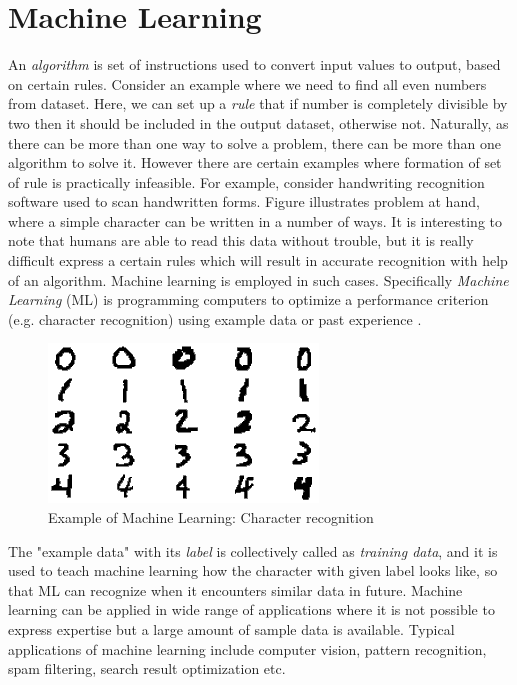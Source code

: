 \chapter{Machine Learning}
\label{chap:chapter3}
An \emph{algorithm} is set of instructions used to convert input values to output, based on certain rules. Consider an example where we need to find all even numbers from dataset. Here, we can set up a \emph{rule} that if number is completely divisible by two then it should be included in the output dataset, otherwise not. Naturally, as there can be more than one way to solve a problem, there can be more than one algorithm to solve it. However there are certain examples where formation of set of rule is practically infeasible. For example, consider handwriting recognition software used to scan handwritten forms. Figure illustrates problem at hand, where a simple character can be written in a number of ways. It is interesting to note that humans are able to read this data without trouble, but it is really difficult express a certain rules which will result in accurate recognition with help of an algorithm. Machine learning is employed in such cases. Specifically \emph{Machine Learning} (ML) is programming computers to optimize a performance criterion (e.g. character recognition) using example data or past experience \cite{Alpaydin2004}. 

\begin{figure}[h]
  \begin{center}
    \captionsetup{justification=centering}
    \includegraphics[scale=0.5]{figures/charrec.png}
    \caption{Example of Machine Learning: Character recognition}
    \label{fig:charrec}
  \end{center}
\end{figure}

The "example data" with its \emph{label} is collectively called as \emph{training data}, and it is used to teach machine learning how the character with given label looks like, so that ML can recognize when it encounters similar data in future. Machine learning can be applied in wide range of applications where it is not possible to express expertise but a large amount of sample data is available. Typical applications of machine learning include computer vision, pattern recognition, spam filtering, search result optimization etc. 

